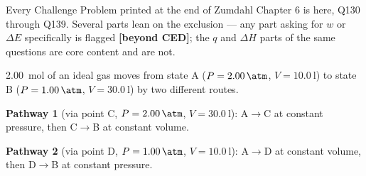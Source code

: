 \documentclass{apchem-exam}
\begin{document}
\clearpage
{}

\begin{apcnote}
Every Challenge Problem printed at the end of Zumdahl Chapter 6 is here,
Q130 through Q139. Several parts lean on the  exclusion --- any
part asking for $w$ or $\Delta E$ specifically is flagged
\textbf{[beyond CED]}; the $q$ and $\Delta H$ parts of the same questions
are core content and are not.
\end{apcnote}


\SI{2.00}{\mole} of an ideal gas moves from state A
(\(P=\SI{2.00}{\atm}\), \(V=\SI{10.0}{\litre}\)) to state B
(\(P=\SI{1.00}{\atm}\), \(V=\SI{30.0}{\litre}\)) by two different routes.

\textbf{Pathway 1} (via point C, \(P=\SI{2.00}{\atm}\),
\(V=\SI{30.0}{\litre}\)): A$\to$C at constant pressure, then C$\to$B at
constant volume.

\textbf{Pathway 2} (via point D, \(P=\SI{1.00}{\atm}\),
\(V=\SI{10.0}{\litre}\)): A$\to$D at constant volume, then D$\to$B at
constant pressure.
\end{document}
